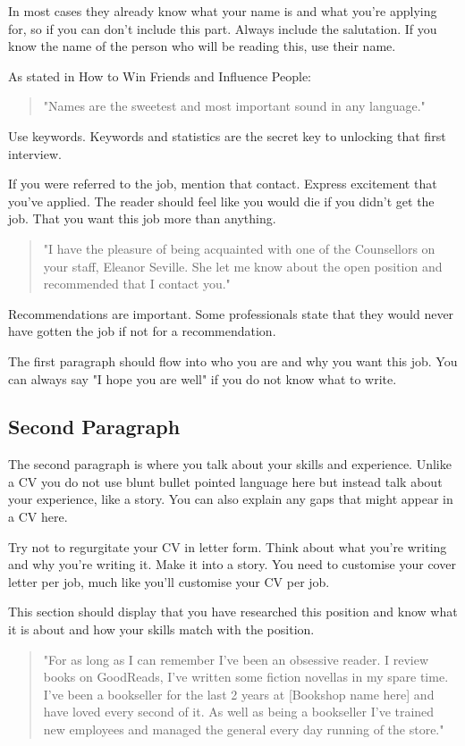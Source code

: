 \documentclass{article}
\begin{document}
In most cases they already know what your name is and what you're
applying for, so if you can don't include this part. Always include the
salutation. If you know the name of the person who will be reading this,
use their name.

As stated in How to Win Friends and Influence People:

\begin{quote}"Names are the sweetest and most important sound in any language."\end{quote}

Use keywords. Keywords and statistics are the secret key to unlocking
that first interview.

If you were referred to the job, mention that contact. Express
excitement that you've applied. The reader should feel like you would
die if you didn't get the job. That you want this job more than
anything.

\begin{quote}"I have the pleasure of being acquainted with one of the Counsellors on your staff, Eleanor Seville. She let me know about the open position and recommended that I contact you." \end{quote}

Recommendations are important. Some professionals state that they would
never have gotten the job if not for a recommendation.

The first paragraph should flow into who you are and why you want this
job. You can always say "I hope you are well" if you do not know what to
write.
\subsection{Second Paragraph}
The second paragraph is where you talk about your skills and experience.
Unlike a CV you do not use blunt bullet pointed language here but
instead talk about your experience, like a story. You can also explain
any gaps that might appear in a CV here.

Try not to regurgitate your CV in letter form. Think about what you're
writing and why you're writing it. Make it into a story. You need to
customise your cover letter per job, much like you'll customise your CV
per job.

This section should display that you have researched this position and
know what it is about and how your skills match with the position.

\begin{quote}"For as long as I can remember I've been an obsessive reader. I review books on GoodReads, I've written some fiction novellas in my spare time.
I've been a bookseller for the last 2 years at {[}Bookshop name here{]}
and have loved every second of it. As well as being a bookseller I've
trained new employees and managed the general every day running of the
store." \end{quote}
\end{document}
